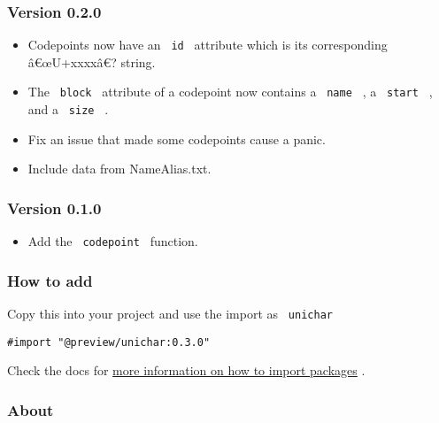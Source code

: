 \subsubsection{Version 0.2.0}\label{version-0.2.0}

\begin{itemize}
\item
  Codepoints now have an \texttt{\ id\ } attribute which is its
  corresponding â€œU+xxxxâ€? string.
\item
  The \texttt{\ block\ } attribute of a codepoint now contains a
  \texttt{\ name\ } , a \texttt{\ start\ } , and a \texttt{\ size\ } .
\item
  Fix an issue that made some codepoints cause a panic.
\item
  Include data from NameAlias.txt.
\end{itemize}

\subsubsection{Version 0.1.0}\label{version-0.1.0}

\begin{itemize}
\tightlist
\item
  Add the \texttt{\ codepoint\ } function.
\end{itemize}

\subsubsection{How to add}\label{how-to-add}

Copy this into your project and use the import as \texttt{\ unichar\ }

\begin{verbatim}
#import "@preview/unichar:0.3.0"
\end{verbatim}



Check the docs for
\href{https://typst.app/docs/reference/scripting/\#packages}{more
information on how to import packages} .

\subsubsection{About}\label{about}

